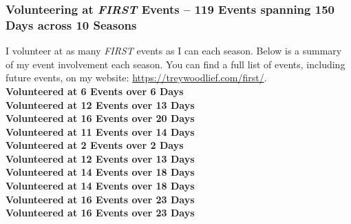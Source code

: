 \subsubsection*{Volunteering at \textit{FIRST} Events -- 119 Events spanning 150 Days across 10 Seasons}
I volunteer at as many \textit{FIRST} events as I can each season. Below is a summary of my event involvement each season.
You can find a full list of events, including future events, on my website: \url{https://treywoodlief.com/first/}.\\ 
 \textbf{Volunteered at 6 Events over 6 Days}\\ 
 \textbf{Volunteered at 12 Events over 13 Days}\\ 
 \textbf{Volunteered at 16 Events over 20 Days}\\ 
 \textbf{Volunteered at 11 Events over 14 Days}\\ 
 \textbf{Volunteered at 2 Events over 2 Days}\\ 
 \textbf{Volunteered at 12 Events over 13 Days}\\ 
 \textbf{Volunteered at 14 Events over 18 Days}\\ 
 \textbf{Volunteered at 14 Events over 18 Days}\\ 
 \textbf{Volunteered at 16 Events over 23 Days}\\ 
 \textbf{Volunteered at 16 Events over 23 Days}\\ 
